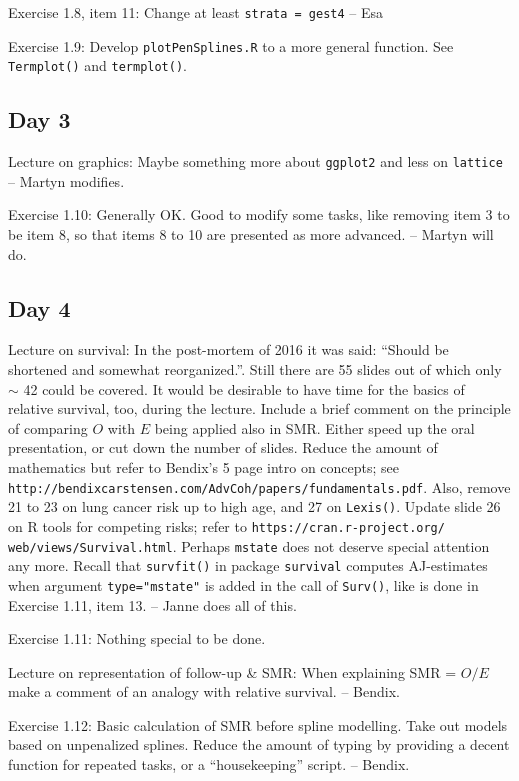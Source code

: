 Exercise 1.8, item 11: Change at least {\tt strata = gest4} -- Esa

Exercise 1.9: Develop {\tt plotPenSplines.R} to a more general function.
See {\tt Termplot()} and {\tt termplot()}. 

\subsection*{Day 3}

Lecture on graphics: Maybe something more about {\tt ggplot2} 
and less on {\tt lattice} -- Martyn modifies.

Exercise 1.10: Generally OK. Good to modify some tasks, like removing item 3 to be item 8, so that items 8 to 10 are presented as more advanced. -- Martyn will do.

\subsection*{Day 4}

Lecture on survival: In the post-mortem of 2016 it was said: 
``Should be shortened and somewhat reorganized.''. 
Still there are 55 slides out of which only $\sim$ 42 could be covered. 
It would be desirable to have time for the basics of relative survival, too,
during the lecture. Include a brief comment on the principle of
comparing $O$ with $E$ being applied also in SMR.
Either speed up the oral presentation, or cut down the number of slides.
Reduce the amount of mathematics but refer to Bendix's 5 page intro
on concepts; see \verb|http://bendixcarstensen.com/AdvCoh/papers/fundamentals.pdf|.
Also, remove 21 to 23 on lung cancer risk up to high age, and 27 on {\tt Lexis()}.
Update slide 26 on R tools for competing risks; refer
to \verb|https://cran.r-project.org/| \verb|web/views/Survival.html|.
 Perhaps {\tt mstate} does not deserve special attention any more.
Recall that {\tt survfit()} 
in package {\tt survival} computes AJ-estimates when argument {\tt type="mstate"}
is added in the call of {\tt Surv()}, like is done in Exercise 1.11, item 13.
-- Janne does all of this.

Exercise 1.11: Nothing special to be done. 

Lecture on representation of follow-up \& SMR: When explaining SMR = $O/E$
 make a comment
of an analogy with relative survival. -- Bendix. 

Exercise 1.12: Basic calculation of SMR before spline modelling.
Take out models based on unpenalized splines.
 Reduce the amount of typing by providing a decent function
for repeated tasks, or a ``housekeeping'' script. -- Bendix.  

